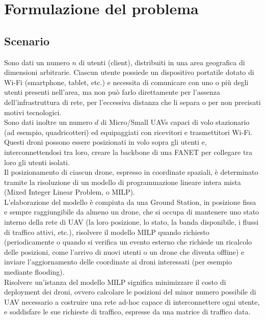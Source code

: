  \chapter{Formulazione del problema}

\ifpdf
    \graphicspath{{Chapter3/Figs/Raster/}{Chapter3/Figs/PDF/}{Chapter3/Figs/}}
\else
    \graphicspath{{Chapter3/Figs/Vector/}{Chapter3/Figs/}}
\fi

\section{Scenario}
Sono dati un numero $n$ di utenti (client), distribuiti in una area geografica di dimensioni arbitrarie. 
Ciascun utente possiede un dispositivo portatile dotato di Wi-Fi (smartphone, tablet, etc.) e necessita di comunicare con uno o più degli utenti presenti nell'area, ma non può farlo direttamente per l'assenza dell'infrastruttura di rete, per l'eccessiva distanza che li separa o per non precisati motivi tecnologici. \\
Sono dati inoltre un numero $d$ di Micro/Small UAVs capaci di volo stazionario (ad esempio, quadricotteri) ed equipaggiati con ricevitori e trasmettitori Wi-Fi. 
Questi droni possono essere posizionati in volo sopra gli utenti e, interconnettendosi tra loro, creare la backbone di una FANET per collegare tra loro gli utenti isolati. \\
Il posizionamento di ciascun drone, espresso in coordinate spaziali, è determinato tramite la risoluzione di un modello di programmazione lineare intera mista (Mixed Integer Linear Problem, o MILP). \\
L'elaborazione del modello è compiuta da una Ground Station, in posizione fissa e sempre raggiungibile da almeno un drone, che si occupa di mantenere uno stato interno della rete di UAV (la loro posizione, lo stato, la banda disponibile, i flussi di traffico attivi, etc.), risolvere il modello MILP quando richiesto (periodicamente o quando si verifica un evento esterno che richiede un ricalcolo delle posizioni, come l'arrivo di nuovi utenti o un drone che diventa offline) e inviare l'aggiornamento delle coordinate ai droni interessati (per esempio mediante flooding). \\
Risolvere un'istanza del modello MILP significa minimizzare il costo di deployment dei droni, ovvero calcolare le posizioni del minor numero possibile di UAV necessario a costruire una rete ad-hoc capace di interconnettere ogni utente, e soddisfare le sue richieste di traffico, espresse da una matrice di traffico data. \\


